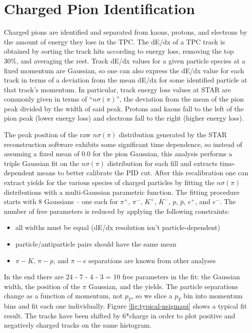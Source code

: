 \section{Charged Pion Identification}

Charged pions are identified and separated from kaons, protons, and electrons by the amount of energy they lose in the TPC.  The dE/dx of a TPC track is obtained by sorting the track hits according to energy loss, removing the top 30\%, and averaging the rest.  Track dE/dx values for a given particle species at a fixed momentum are Gaussian, so one can also express the dE/dx value for each track in terms of a deviation from the mean dE/dx for some identified particle at that track's momentum.  In particular, track energy loss values at STAR are commonly given in terms of ``$n\sigma(\pi)$'', the deviation from the mean of the pion peak divided by the width of said peak.  Protons and kaons fall to the left of the pion peak (lower energy loss) and electrons fall to the right (higher energy loss).

The peak position of the raw $n\sigma(\pi)$ distribution generated by the STAR reconstruction software exhibits some significant time dependence, so instead of assuming a fixed mean of 0.0 for the pion Gaussian,  this analysis performs a triple Gaussian fit on the $n\sigma(\pi)$ distribution for each fill and extracts time-dependent means to better calibrate the PID cut.  After this recalibration one can extract yields for the various species of charged particles by fitting the $n\sigma(\pi)$ distributions with a multi-Gaussian parametric function.  The fitting procedure starts with 8 Gaussians -- one each for $\pi^{+}$, $\pi^{-}$, $K^{+}$, $K^{-}$, $p$, $\bar{p}$, $e^{+}$, and $e^{-}$.  The number of free parameters is reduced by applying the following constraints:

\begin{itemize}
    \item all widths must be equal (dE/dx resolution isn't particle-dependent)
    \item particle/antiparticle pairs should have the same mean
    \item $\pi - K$, $\pi - p$, and $\pi - e$ separations are known from other analyses \cite{Xu:2008th}
\end{itemize}

In the end there are 24 - 7 - 4 - 3 = 10 free parameters in the fit:  the Gaussian width, the position of the $\pi$ Gaussian, and the yields.  The particle separations change as a function of momentum, not $p_{T}$, so we slice a $p_{T}$ bin into momentum bins and fit each one individually.  Figure \ref{fig:typical-nsigmapi} shows a typical fit result.  The tracks have been shifted by 6*charge in order to plot positive and negatively charged tracks on the same histogram.

